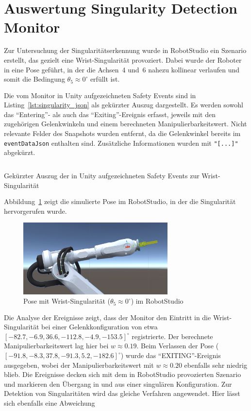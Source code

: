 \section{Auswertung Singularity Detection Monitor}
\label{sec:singularityauswertung}
Zur Untersuchung der Singularitätserkennung wurde in RobotStudio ein Szenario erstellt,
das gezielt eine Wrist-Singularität provoziert. Dabei wurde der Roboter in eine Pose
geführt, in der die Achsen~4 und~6 nahezu kollinear verlaufen und somit die Bedingung
$\theta_{5} \approx 0^\circ$ erfüllt ist.

Die vom Monitor in Unity aufgezeichneten Safety Events sind in
Listing~\ref{lst:singularity_json} als gekürzter Auszug dargestellt. Es werden sowohl
das \enquote{Entering}- als auch das \enquote{Exiting}-Ereignis erfasst, jeweils mit den
zugehörigen Gelenkwinkeln und einem berechneten Manipulierbarkeitswert. Nicht relevante
Felder des Snapshots wurden entfernt, da die Gelenkwinkel bereits im \texttt{eventDataJson}
enthalten sind. Zusätzliche Informationen wurden mit \texttt{"[...]"} abgekürzt.

\begin{listing}[H]
	\centering
	\inputminted[fontsize=\footnotesize,breaklines]{json}{code-snippets/singularityerror.json}
	\caption{Gekürzter Auszug der in Unity aufgezeichneten Safety Events zur Wrist-Singularität}
	\label{lst:singularity_json}
\end{listing}

Abbildung~\ref{fig:wrist_singularity} zeigt die simulierte Pose im RobotStudio, in der die
Singularität hervorgerufen wurde.

\begin{figure}[H]
	\centering
	\includegraphics[width=0.7\textwidth]{figures/wristSingularityScreenshot.jpg}
	\caption{Pose mit Wrist-Singularität ($\theta_{5} \approx 0^\circ$) im RobotStudio}
	\label{fig:wrist_singularity}
\end{figure}

Die Analyse der Ereignisse zeigt, dass der Monitor den Eintritt in die Wrist-Singularität
bei einer Gelenkkonfiguration von etwa
$[-82.7, -6.9, 36.6, -112.8, -4.9, -153.5]^\circ$ registrierte. Der berechnete
Manipulierbarkeitswert lag hier bei $w \approx 0.19$. Beim Verlassen der Pose
($[-91.8, -8.3, 37.8, -91.3, 5.2, -182.6]^\circ$) wurde das \enquote{EXITING}-Ereignis
ausgegeben, wobei der Manipulierbarkeitswert mit $w \approx 0.20$ ebenfalls sehr niedrig blieb.
Die Ereignisse decken sich mit dem in RobotStudio provozierten Szenario und markieren den
Übergang in und aus einer singulären Konfiguration.
Zur Detektion von Singularitäten wird das gleiche Verfahren angewendet. Hier
lässt sich ebenfalls eine Abweichung

